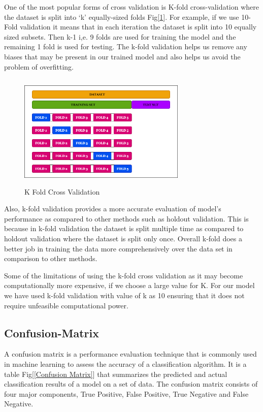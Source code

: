 \documentclass[conference]{IEEEtran}
\begin{document}
\vspace{5pt}
One of the most popular forms of cross validation is K-fold cross-validation where the dataset is split into ‘k’ equally-sized folds Fig[\ref{K Fold Cross Validation}]. For example, if we use 10-Fold validation it means that in each iteration the dataset is split into 10 equally sized subsets. Then k-1 i,e. 9 folds are used for training the model and the remaining 1 fold is used for testing. The k-fold validation helps us remove any biases that may be present in our trained model and also helps us avoid the problem of overfitting. 

\begin{figure}[ht]
    \centering
    \includegraphics[width=8cm, height = 5.5cm]{Images/K Fold Cross Validation.png}
    \caption{K Fold Cross Validation}
    \label{K Fold Cross Validation}
\end{figure}

\vspace{5pt}
Also, k-fold validation provides a more accurate evaluation of model’s performance as compared to other methods such as holdout validation. This is because in k-fold validation the dataset is split multiple time as compared to holdout validation where the dataset is split only once. Overall k-fold does a better job in training the data more comprehensively over the data set in comparison to other methods.

\vspace{5pt}
Some of the limitations of using the k-fold cross validation as it may become computationally more expensive, if we choose a large value for K. For our model we have used k-fold validation with value of k as 10 ensuring that it does not require unfeasible computational power.

\subsection{Confusion-Matrix}
A confusion matrix is a performance evaluation technique that is commonly used in machine learning to assess the accuracy of a classification algorithm. It is a table Fig[\ref{Confusion Matrix}] that summarizes the predicted and actual classification results of a model on a set of data. The confusion matrix consists of four major components, True Positive, False Positive, True Negative and False Negative.
\end{document}
